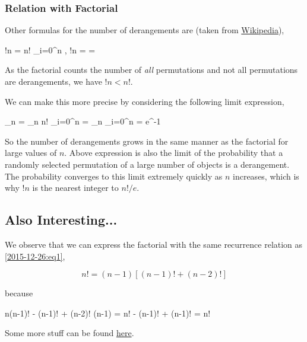 \subsubsection{Relation with Factorial}

Other formulas for the number of derangements are (taken from \href{https://en.wikipedia.org/wiki/Derangement}{Wikipedia}),

\bee
!n = n! \sum_{i=0}^n , \quad !n =  = \left\lfloor {} \right\rfloor
\eee

As the factorial counts the number of \emph{all} permutations and not all permutations are derangements, we have $!n < n!$.

We can make this more precise by considering the following limit expression,

\bee
\lim_{n \rightarrow \infty}  = \lim_{n \rightarrow \infty} n! \sum_{i=0}^n   = \lim_{n \rightarrow \infty} \sum_{i=0}^n  = e^{-1} 
\eee

So the number of derangements grows in the same manner as the factorial for large values of $n$. Above expression is also the limit of the probability that a randomly selected permutation of a large number of objects is a derangement. The probability converges to this limit extremely quickly as $n$ increases, which is why $!n$ is the nearest integer to $n!/e$. 


\subsection{Also Interesting...}

We observe that we can express the factorial with the same recurrence relation as \eqref{2015-12-26:eq1},

\begin{equation}
\label{2015-12-26:eq3}
n!= (n-1) \left[ (n-1)! +  (n-2)!\right]
\end{equation}

because

\bee
n(n-1)! - (n-1)! + (n-2)! (n-1) = n! - (n-1)! + (n-1)! = n!
\eee

Some more stuff can be found \href{http://math.ucr.edu/home/baez/qg-winter2004/derangement.pdf}{here}.

